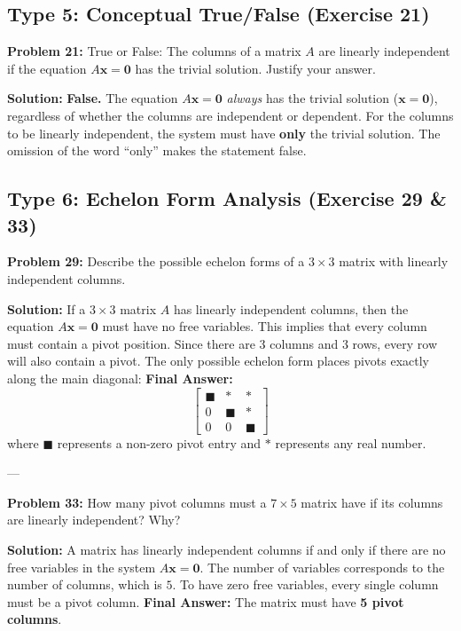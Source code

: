 \documentclass[11pt]{article}
\begin{document}
\subsection{Type 5: Conceptual True/False (Exercise 21)}

\textbf{Problem 21:} True or False: The columns of a matrix $A$ are linearly independent if the equation $A\mathbf{x} = \mathbf{0}$ has the trivial solution. Justify your answer.

\textbf{Solution:}
\textbf{False.} The equation $A\mathbf{x} = \mathbf{0}$ \textit{always} has the trivial solution ($\mathbf{x} = \mathbf{0}$), regardless of whether the columns are independent or dependent. For the columns to be linearly independent, the system must have \textbf{only} the trivial solution. The omission of the word ``only'' makes the statement false.

\subsection{Type 6: Echelon Form Analysis (Exercise 29 \& 33)}

\textbf{Problem 29:} Describe the possible echelon forms of a $3 \times 3$ matrix with linearly independent columns.

\textbf{Solution:}
If a $3 \times 3$ matrix $A$ has linearly independent columns, then the equation $A\mathbf{x} = \mathbf{0}$ must have no free variables. This implies that every column must contain a pivot position. Since there are 3 columns and 3 rows, every row will also contain a pivot. The only possible echelon form places pivots exactly along the main diagonal:
\textbf{Final Answer:} 
\[
\begin{bmatrix}
\blacksquare & \ast & \ast \\
0 & \blacksquare & \ast \\
0 & 0 & \blacksquare
\end{bmatrix}
\]
where $\blacksquare$ represents a non-zero pivot entry and $\ast$ represents any real number.

---

\textbf{Problem 33:} How many pivot columns must a $7 \times 5$ matrix have if its columns are linearly independent? Why?

\textbf{Solution:}
A matrix has linearly independent columns if and only if there are no free variables in the system $A\mathbf{x} = \mathbf{0}$. The number of variables corresponds to the number of columns, which is $5$. To have zero free variables, every single column must be a pivot column. 
\textbf{Final Answer:} The matrix must have \textbf{5 pivot columns}.
\end{document}
